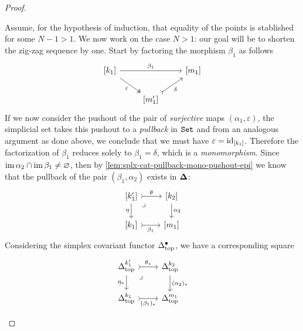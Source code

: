 \begin{proof}
\begin{itemize}
              Assume, for the hypothesis of induction, that equality of the points is
              stablished for some \(N-1 > 1\). We now work on the case \(N > 1\): our goal
              will be to shorten the zig-zag sequence by one. Start by factoring the
              morphism \(\beta_1\) as follows
              \[
                  \begin{tikzcd}
                      {[k_1]} \ar[rr, "\beta_1"] \ar[rd, two heads, "\varepsilon"']
                      & &{[m_1]} \\
                      &{[m_1']} \ar[ur, tail, "\delta"'] &
                  \end{tikzcd}
              \]
              If we now consider the pushout of the pair of \emph{surjective} maps
              \((\alpha_1, \varepsilon)\), the simplicial set takes this pushout to a
              \emph{pullback} in \({\texttt{Set}}\) and from an analogous argument as done above, we
              conclude that we must have \(\varepsilon = \operatorname{id}_{[k_1]}\). Therefore the
              factorization of \(\beta_1\) reduces solely to \(\beta_1 = \delta\), which is
              a \emph{monomorphism}. Since \(\operatorname{im} \alpha_2 \cap \operatorname{im} \beta_1 \neq \varnothing\),
              then by \cref{lem:splx-cat-pullback-mono-pushout-epi} we know that the
              pullback of the pair \((\beta_1, \alpha_2)\) exists in \({\mathbf{\Delta}}\):
              \begin{equation}\label{eq:pullback-unique-nd-pt-xi}
                  \begin{tikzcd}
                      {[k_1']} \ar[r, tail, "\theta"]
                      \ar[rd, phantom, very near start, "\lrcorner"]
                      \ar[d, "\eta"']
                      &{[k_2]} \ar[d, "\alpha_2"] \\
                      {[k_1]} \ar[r, tail, "\beta_1"'] &{[m_1]}
                  \end{tikzcd}
              \end{equation}
              Considering the simplex covariant functor \(\Delta_{\text{top}}^{\bullet}\), we have a
              corresponding square
              \[
                  \begin{tikzcd}
                      \splxtop^{k_1'} \ar[r, tail, "\theta_{*}"]
                      \ar[d, "\eta_{*}"']
                      \ar[rd, phantom, very near start, "\lrcorner"]
                      &\splxtop^{k_2} \ar[d, "(\alpha_2)_{*}"] \\
                      \splxtop^{k_1} \ar[r, tail, "(\beta_1)_{*}"'] &\splxtop^{m_1}

\end{tikzcd}\]
\end{itemize}
\end{proof}
